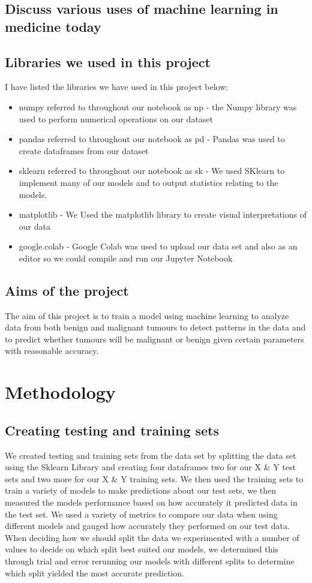 \documentclass[conference]{IEEEtran}
\begin{document}
\subsection{Discuss various uses of machine learning in medicine today}
\subsection{Libraries we used in this project}
I have listed the libraries we have used in this project below:
\begin{itemize}
    \item numpy referred to throughout our notebook as np\cite{numpy}  - the Numpy library was used to perform numerical operations on our dataset
    \item pandas referred to throughout our notebook as pd \cite{pandas} - Pandas was used to create dataframes from our dataset
    \item sklearn referred to throughout our notebook as sk \cite{sklearn} - We used SKlearn to implement many of our models and to output statistics relating to the models.
    \item matplotlib \cite{matplotlib} - We Used the matplotlib library to create visual interpretations of our data
    \item google.colab \cite{googlecolab} - Google Colab was used to upload our data set and also as an editor so we could compile and run our Jupyter Notebook\cite{jupyter}
\end{itemize}
\subsection{Aims of the project}
 The aim of this project is to train a model using machine learning to analyze data from both benign and malignant tumours to detect patterns in the data and to predict whether tumours will be malignant or benign given certain parameters with reasonable accuracy.
\section{Methodology}
\subsection{Creating testing and training sets}
We created testing and training sets from the data set by splitting the data set using the Sklearn Library\cite{sklearn} and creating four dataframes two for our X \& Y test sets and two more for our X \& Y training sets.  We then used the training sets to train a variety of models to make predictions about our test sets, we then measured the models performance based on how accurately it predicted data in the test set.  We used a variety of metrics to compare our data when using different models and gauged how accurately they performed on our test data.  When deciding how we should split the data we experimented with a number of values to decide on which split best suited our models, we determined this through trial and error rerunning our models with different splits to determine which split yielded the most accurate prediction.  
\end{document}
